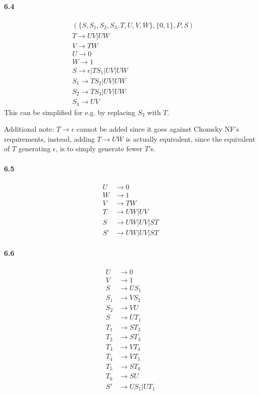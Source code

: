 \documentclass{article}
\begin{document}
\paragraph{6.4}
\begin{align*}
	&(\{S,S_1,S_2,S_3,T,U,V,W\}, \{0,1\}, P, S)\\
	&T\rightarrow UV | UW\\
	&V\rightarrow TW\\
	&U\rightarrow 0\\
	&W\rightarrow 1\\
	&S\rightarrow \epsilon | TS_1 | UV | UW\\
	&S_1\rightarrow TS_2 | UV | UW\\
	&S_2\rightarrow TS_3 | UV | UW\\
	&S_3\rightarrow UV
\end{align*}
This can be simplified for e.g. by replacing $S_3$ with $T$.

Additional note: $T\rightarrow \epsilon$ cannot be added since it goes against Chomsky NF's requirements, instead, adding $T\rightarrow UW$ is actually equivalent, since the equivalent of $T$ generating $\epsilon$, is to simply generate fewer $T$'s.

\paragraph{6.5}
\begin{align*}
	U&\rightarrow 0\\
	W&\rightarrow 1\\
	V&\rightarrow TW\\
	T&\rightarrow UW|UV\\
	S&\rightarrow UW|UV|ST\\
	S'&\rightarrow UW|UV|ST
\end{align*}

\paragraph{6.6}
\begin{align*}
	U&\rightarrow 0\\
	V&\rightarrow 1\\
	S&\rightarrow US_1\\
	S_1&\rightarrow VS_2\\
	S_2&\rightarrow VU\\
	S&\rightarrow UT_1\\
	T_1&\rightarrow ST_2\\
	T_2&\rightarrow ST_3\\
	T_3&\rightarrow VT_4\\
	T_4&\rightarrow VT_5\\
	T_5&\rightarrow ST_6\\
	T_6&\rightarrow SU\\
	S'&\rightarrow US_1 | UT_1
\end{align*}
\pagebreak
\end{document}
